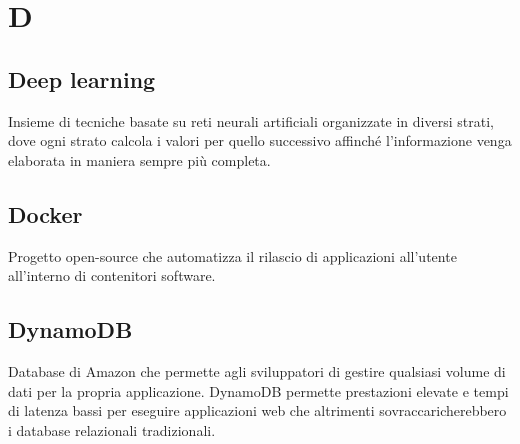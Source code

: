 \section*{D}
\markright{}
\subsection*{Deep learning}
Insieme di tecniche basate su reti neurali artificiali organizzate in diversi strati, dove ogni strato calcola i valori per quello successivo affinché l'informazione venga elaborata in maniera sempre più completa.
\subsection*{Docker}
Progetto open-source che automatizza il rilascio di applicazioni all'utente all'interno di contenitori software.
\subsection*{DynamoDB}
Database  di Amazon che permette agli sviluppatori di gestire qualsiasi volume di dati per la propria applicazione. DynamoDB permette prestazioni elevate e tempi di latenza bassi per eseguire applicazioni web che altrimenti sovraccaricherebbero i database relazionali tradizionali.
